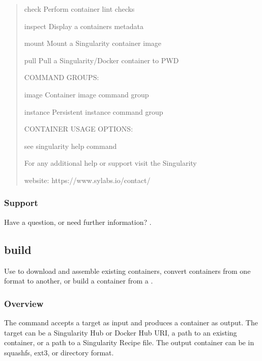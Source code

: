 \documentclass[letterpaper,10pt,english]{sphinxmanual}
\begin{document}
\begin{quote}
\begin{sphinxVerbatim}[commandchars=\\\{\}]
    check      Perform container lint checks

    inspect    Display a container\PYGZsq{}s metadata

    mount      Mount a Singularity container image

    pull       Pull a Singularity/Docker container to \PYGZdl{}PWD


COMMAND GROUPS:

    image      Container image command group

    instance   Persistent instance command group



CONTAINER USAGE OPTIONS:

    see singularity help \PYGZlt{}command\PYGZgt{}


For any additional help or support visit the Singularity

website: https://www.sylabs.io/contact/
\end{sphinxVerbatim}
\end{quote}


\subsubsection{Support}
\label{\detokenize{appendix:support}}
Have a question, or need further information? .


\subsection{build}
\label{\detokenize{appendix:build}}\label{\detokenize{appendix:build-command}}
Use  to download and assemble existing containers, convert containers
from one format to another, or build a container from a {\hyperref[\detokenize{container_recipes:container-recipes}]{}}.


\subsubsection{Overview}
\label{\detokenize{appendix:id31}}
The  command accepts a target as input and produces a container as
output. The target can be a Singularity Hub or Docker Hub URI, a path
to an existing container, or a path to a Singularity Recipe file. The
output container can be in squashfs, ext3, or directory format.
\end{document}

